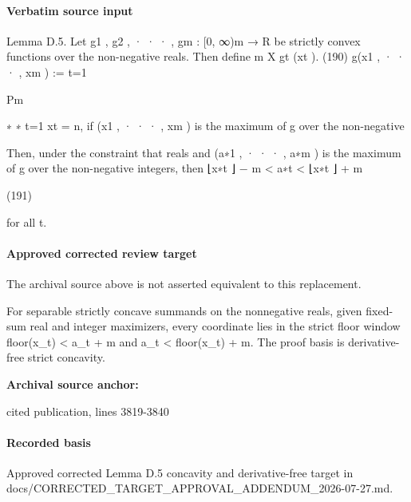 \documentclass[10pt]{article}
\begin{document}
\paragraph{Verbatim source input}
\begin{ReviewVerbatim}
Lemma D.5. Let g1 , g2 , · · · , gm : [0, ∞)m → R be strictly convex functions over the non-negative reals. Then
define
m
X
gt (xt ).
(190)
g(x1 , · · · , xm ) :=
t=1

Pm

∗
∗
t=1 xt = n, if (x1 , · · · , xm ) is the maximum of g over the non-negative

Then, under the constraint that
reals and (a∗1 , · · · , a∗m ) is the maximum of g over the non-negative integers, then
⌊x∗t ⌋ − m < a∗t < ⌊x∗t ⌋ + m

(191)

for all t.
\end{ReviewVerbatim}

\paragraph{Approved corrected review target}
The archival source above is not asserted equivalent to this replacement.
\begin{ReviewVerbatim}
For separable strictly concave summands on the nonnegative reals, given fixed-sum real and integer maximizers, every coordinate lies in the strict floor window floor(x_t) < a_t + m and a_t < floor(x_t) + m. The proof basis is derivative-free strict concavity.
\end{ReviewVerbatim}

\textbf{Archival source anchor:} {\footnotesize\raggedright cited publication, lines 3819-\allowbreak{}3840\par}
\paragraph{Recorded basis}
Approved corrected Lemma D.\allowbreak{}5 concavity and derivative-\allowbreak{}free target in docs/\allowbreak{}CORRECTED\_\allowbreak{}TARGET\_\allowbreak{}APPROVAL\_\allowbreak{}ADDENDUM\_\allowbreak{}2026-\allowbreak{}07-\allowbreak{}27.\allowbreak{}md.\allowbreak{}
\end{document}
